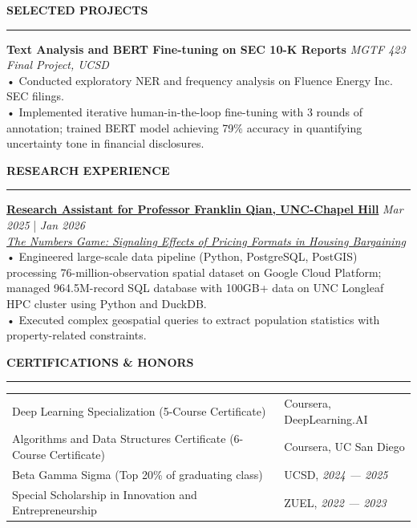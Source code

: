 \documentclass{resume} %
\renewcommand{\sectionskip}{\vspace{0.10cm}}        %
\renewcommand{\sectionlineskip}{\vspace{0.10cm}}
\renewenvironment{rSection}[1]{
\sectionskip
\textcolor{UC San Diego Blue}{\textbf{\large\bfseries\MakeUppercase{#1}}}

\sectionlineskip
\hrule
\begin{list}{}{
\setlength{\leftmargin}{0em}
}
\item[]
}{
\end{list}
}
\begin{document}
\begin{rSection}{SELECTED PROJECTS}
\noindent
\textbf{Text Analysis and BERT Fine-tuning on SEC 10-K Reports} \hfill \textit{MGTF 423 Final Project, UCSD}\\
• Conducted exploratory NER and frequency analysis on Fluence Energy Inc. SEC filings.\\[1.5pt]
• Implemented iterative human-in-the-loop fine-tuning with 3 rounds of annotation; trained BERT model achieving 79\% accuracy in quantifying uncertainty tone in financial disclosures.

\begin{rSection}{RESEARCH EXPERIENCE}
\noindent
\textbf{\href{https://github.com/YuankaiTao-super/Construction-of-Comparable-Housing-Variables}{Research Assistant for Professor Franklin Qian, UNC-Chapel Hill}} \hfill {\em Mar 2025} | {\em Jan 2026}\\
\textit{\href{https://papers.ssrn.com/sol3/papers.cfm?abstract_id=4406954}{The Numbers Game: Signaling Effects of Pricing Formats in Housing Bargaining}}\\[4pt]
• Engineered large-scale data pipeline (Python, PostgreSQL, PostGIS) processing 76-million-observation spatial dataset on Google Cloud Platform; managed 964.5M-record SQL database with 100GB+ data on UNC Longleaf HPC cluster using Python and DuckDB.\\[1.5pt]
• Executed complex geospatial queries to extract population statistics with property-related constraints.

\end{rSection}

\end{rSection}

\begin{rSection}{Certifications \& Honors}
\begin{tabularx}{\textwidth}{@{} >{\raggedright\arraybackslash}X >{\raggedleft\arraybackslash\hyphenpenalty=10000\exhyphenpenalty=10000}p{4.8cm} @{}}
Deep Learning Specialization (5-Course Certificate) & Coursera, DeepLearning.AI \\
Algorithms and Data Structures Certificate (6-Course Certificate) & Coursera, UC San Diego \\
Beta Gamma Sigma (Top 20\% of graduating class) & UCSD, {\em 2024 --- 2025} \\
Special Scholarship in Innovation and Entrepreneurship & ZUEL, {\em 2022 --- 2023}
\end{tabularx}
\end{rSection}
\end{document}

